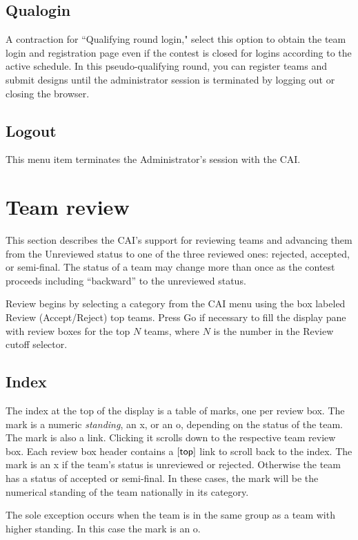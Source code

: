 \documentclass[11pt,letterpaper]{refart}
\def\ui#1{\textsf{#1}}
\begin{document}
\subsection{Qualogin}
A contraction for ``Qualifying round login," select this option to obtain the
team login and registration page even if the contest is closed for logins 
according to the active schedule. In this pseudo-qualifying round, you can 
register teams and submit designs until the administrator session is 
terminated by logging out or closing the browser.

\subsection{Logout}
This menu item terminates the Administrator's session with the CAI.

\section{Team review}
This section describes the CAI's support for reviewing teams and advancing
them from the Unreviewed status to one of the three reviewed ones: rejected,
accepted, or semi-final. The status of a team may change more than once as
the contest proceeds including ``backward'' to the unreviewed status.

Review begins by selecting a category from the CAI menu using the box labeled
\ui{Review (Accept/Reject) top teams}. Press \ui{Go} if necessary to fill
the display pane with review boxes for the top $N$ teams, where $N$ is the number
in the \ui{Review cutoff} selector. 

\subsection{Index}
The index at the top of the display is a table of marks, one per review box. The 
mark is a numeric \emph{standing}, an \ui{x}, or an \ui{o}, depending on the status of
the team. The mark is also a link. Clicking it scrolls down to the respective team
review box. Each review box header contains a $[\hbox{\ui{top}}]$ link to scroll
back to the index. The mark is an \ui{x} if the team's status is unreviewed or
rejected. Otherwise the team has a status of accepted or semi-final. In these 
cases, the mark will be the numerical standing of the team nationally in its
category.

The sole exception occurs when the team is in the same group as a 
team with higher standing. In this case the mark is an \ui{o}.
\end{document}
